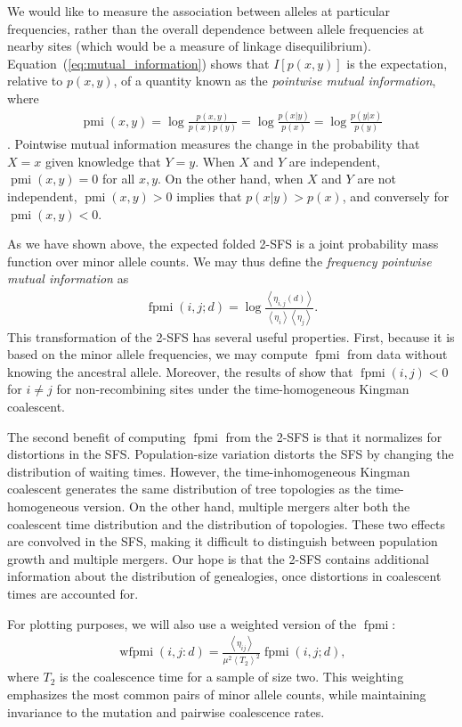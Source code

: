 \documentclass[11pt, letterpaper]{article}   	%
\newcommand{\Eq}[1]{Equation~(\ref{#1})}
\newcommand{\E}[1]{\left< #1 \right>}
\DeclareMathOperator{\pmi}{pmi}
\DeclareMathOperator{\fpmi}{fpmi}
\DeclareMathOperator{\wfpmi}{wfpmi}
\begin{document}
We would like to measure the association between alleles at particular frequencies, rather than the overall dependence between allele frequencies at nearby sites (which would be a measure of linkage disequilibrium).
\Eq{eq:mutual_information} shows that $I[p(x,y)]$ is the expectation, relative to $p(x,y)$, of a quantity known as the \textit{pointwise mutual information}, where
\begin{align}
    \pmi(x,y) = \log \frac{p(x,y)}{p(x)p(y)} = \log \frac{p(x|y)}{p(x)} = \log \frac{p(y|x)}{p(y)}
\end{align}
\autocite{ChurchHanks1990}.
Pointwise mutual information measures the change in the probability that $X=x$ given knowledge that $Y=y$.
When $X$ and $Y$ are independent, $\pmi(x,y) = 0$ for all $x,y$.
On the other hand, when $X$ and $Y$ are not independent, $\pmi(x,y) > 0$ implies that $p(x|y) > p(x)$, and conversely for $\pmi(x,y) < 0$.

As we have shown above, the expected folded 2-SFS is a joint probability mass function over minor allele counts.
We may thus define the \textit{frequency pointwise mutual information} as
\begin{align}
    \fpmi(i,j;d) = \log \frac{\E{\eta_{i,j}(d)}}{\E{\eta_i} \E{\eta_j}}.
\end{align}
This transformation of the 2-SFS has several useful properties.
First, because it is based on the minor allele frequencies, we may compute $\fpmi$ from data without knowing the ancestral allele.
Moreover, the results of \cite{Fu1995} show that $\fpmi(i,j) < 0$ for $i\neq j$ for non-recombining sites under the time-homogeneous Kingman coalescent.

The second benefit of computing $\fpmi$ from the 2-SFS is that it normalizes for distortions in the SFS.
Population-size variation distorts the SFS by changing the distribution of waiting times.
However, the time-inhomogeneous Kingman coalescent generates the same distribution of tree topologies as the time-homogeneous version.
On the other hand, multiple mergers alter both the coalescent time distribution and the distribution of topologies.
These two effects are convolved in the SFS, making it difficult to distinguish between population growth and multiple mergers.
Our hope is that the 2-SFS contains additional information about the distribution of genealogies, once distortions in coalescent times are accounted for.

For plotting purposes, we will also use a weighted version of the $\fpmi$:
\begin{align}
    \wfpmi(i,j:d) = \frac{\E{\eta_{ij}}}{\mu^2 \E{T_2}^2} \fpmi(i,j;d),
\end{align}
where $T_2$ is the coalescence time for a sample of size two.
This weighting emphasizes the most common pairs of minor allele counts, while maintaining invariance to the mutation and pairwise coalescence rates.
\end{document}

